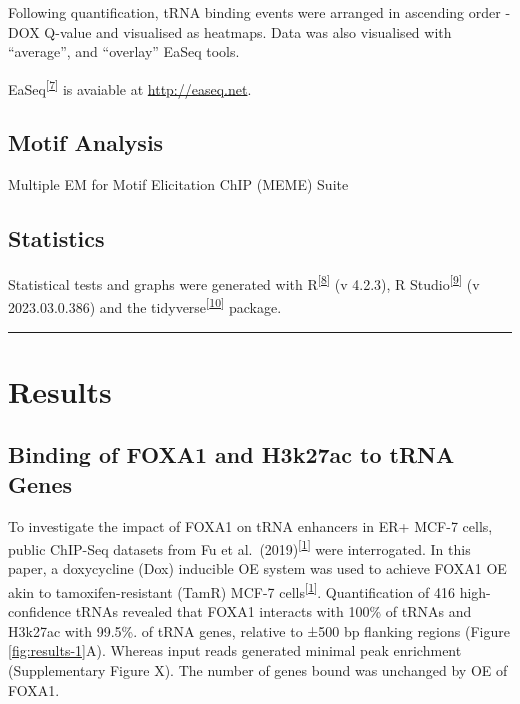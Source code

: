 \documentclass[
  12pt,
]{article}
\begin{document}
Following quantification, tRNA binding events were arranged in ascending order -DOX Q-value and visualised as heatmaps.
Data was also visualised with ``average'', and ``overlay'' EaSeq tools.

EaSeq\textsuperscript{{[}\protect\hyperlink{ref-lerdrup2016}{7}{]}} is avaiable at \url{http://easeq.net}.

\hypertarget{motif-analysis}{%
\subsection{Motif Analysis}\label{motif-analysis}}

Multiple EM for Motif Elicitation ChIP (MEME) Suite

\hypertarget{statistics}{%
\subsection{Statistics}\label{statistics}}

Statistical tests and graphs were generated with R\textsuperscript{{[}\protect\hyperlink{ref-r}{8}{]}} (v 4.2.3), R Studio\textsuperscript{{[}\protect\hyperlink{ref-rstudio}{9}{]}} (v 2023.03.0.386) and the tidyverse\textsuperscript{{[}\protect\hyperlink{ref-wickham2019}{10}{]}} package.

\begin{center}\rule{0.5\linewidth}{0.5pt}\end{center}

\hypertarget{results}{%
\section{Results}\label{results}}

\hypertarget{binding-of-foxa1-and-h3k27ac-to-trna-genes}{%
\subsection{Binding of FOXA1 and H3k27ac to tRNA Genes}\label{binding-of-foxa1-and-h3k27ac-to-trna-genes}}

To investigate the impact of FOXA1 on tRNA enhancers in ER+ MCF-7 cells, public ChIP-Seq datasets from Fu et al.~(2019)\textsuperscript{{[}\protect\hyperlink{ref-fu2019}{1}{]}} were interrogated.
In this paper, a doxycycline (Dox) inducible OE system was used to achieve FOXA1 OE akin to tamoxifen-resistant (TamR) MCF-7 cells\textsuperscript{{[}\protect\hyperlink{ref-fu2019}{1}{]}}.
Quantification of 416 high-confidence tRNAs revealed that FOXA1 interacts with 100\% of tRNAs and H3k27ac with 99.5\%.
of tRNA genes, relative to ±500 bp flanking regions (Figure \ref{fig:results-1}A).
Whereas input reads generated minimal peak enrichment (Supplementary Figure X).
The number of genes bound was unchanged by OE of FOXA1.
\end{document}
